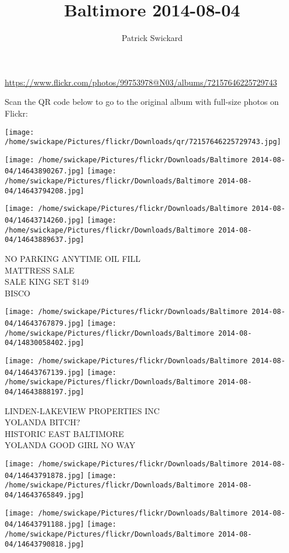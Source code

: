 \documentclass[10pt,letterpaper]{article}
\title{Baltimore 2014-08-04}
\author{Patrick Swickard}
\date{}
\begin{document}
\maketitle

\url{https://www.flickr.com/photos/99753978@N03/albums/72157646225729743}

Scan the QR code below to go to the original album with full-size photos on Flickr:

\texttt{[image: /home/swickape/Pictures/flickr/Downloads/qr/72157646225729743.jpg]}
\pagebreak

\texttt{[image: /home/swickape/Pictures/flickr/Downloads/Baltimore 2014-08-04/14643890267.jpg]}
\texttt{[image: /home/swickape/Pictures/flickr/Downloads/Baltimore 2014-08-04/14643794208.jpg]}

\texttt{[image: /home/swickape/Pictures/flickr/Downloads/Baltimore 2014-08-04/14643714260.jpg]}
\texttt{[image: /home/swickape/Pictures/flickr/Downloads/Baltimore 2014-08-04/14643889637.jpg]}

NO PARKING ANYTIME OIL FILL\\
MATTRESS SALE\\
SALE KING SET \$149\\
BISCO
\pagebreak

\texttt{[image: /home/swickape/Pictures/flickr/Downloads/Baltimore 2014-08-04/14643767879.jpg]}
\texttt{[image: /home/swickape/Pictures/flickr/Downloads/Baltimore 2014-08-04/14830058402.jpg]}

\texttt{[image: /home/swickape/Pictures/flickr/Downloads/Baltimore 2014-08-04/14643767139.jpg]}
\texttt{[image: /home/swickape/Pictures/flickr/Downloads/Baltimore 2014-08-04/14643888197.jpg]}

LINDEN{-}LAKEVIEW PROPERTIES INC\\
YOLANDA BITCH?\\
HISTORIC EAST BALTIMORE\\
YOLANDA GOOD GIRL NO WAY
\pagebreak

\texttt{[image: /home/swickape/Pictures/flickr/Downloads/Baltimore 2014-08-04/14643791878.jpg]}
\texttt{[image: /home/swickape/Pictures/flickr/Downloads/Baltimore 2014-08-04/14643765849.jpg]}

\texttt{[image: /home/swickape/Pictures/flickr/Downloads/Baltimore 2014-08-04/14643791188.jpg]}
\texttt{[image: /home/swickape/Pictures/flickr/Downloads/Baltimore 2014-08-04/14643790818.jpg]}
\end{document}
